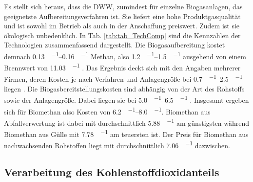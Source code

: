 Es stellt sich heraus, dass die \gls{DWW}, zumindest für einzelne Biogasanlagen, das geeignetste Aufbereitungsverfahren ist. Sie liefert eine hohe Produktgasqualität und ist sowohl im Betrieb als auch in der Anschaffung preiswert. Zudem ist sie ökologisch unbedenklich. In Tab. \ref{tab:tab_TechComp} sind die Kennzahlen der Technologien zusammenfassend dargestellt. Die Biogasaufbereitung kostet demnach \SIrange{0,13}{0,16}{\sieuro\per\normvol} Methan, also \SIrange{1,2}{1,5}{\ct\per\kwh} ausgehend von einem Brennwert von \SI{11,03}{\kwh\per\normvol} \parencite{meier14}. Das Ergebnis deckt sich mit den Angaben mehrerer Firmen, deren Kosten je nach Verfahren und Anlagengröße bei \SIrange{0,7}{2,5}{\ct\per\kwh} liegen \parencite{FNR14}. Die Biogasbereitstellungskosten sind abhängig von der Art des Rohstoffs sowie der Anlagengröße. Dabei liegen sie bei \SIrange{5,0}{6,5}{\ct\per\kwh} \parencite{FNR14}. Insgesamt ergeben sich für Biomethan also Kosten von \SIrange{6,2}{8,0}{\ct\per\kwh}. Biomethan aus Abfallverwertung ist dabei mit durchschnittlich \SI{5,88}{\ct\per\kwh} am günstigsten während Biomethan aus Gülle mit \SI{7,78}{\ct\per\kwh} am teuersten ist. Der Preis für Biomethan aus nachwachsenden Rohstoffen liegt mit durchschnittlich \SI{7,06}{\ct\per\kwh} dazwischen\parencite{dena19}.




\subsection{Verarbeitung des Kohlenstoffdioxidanteils}


